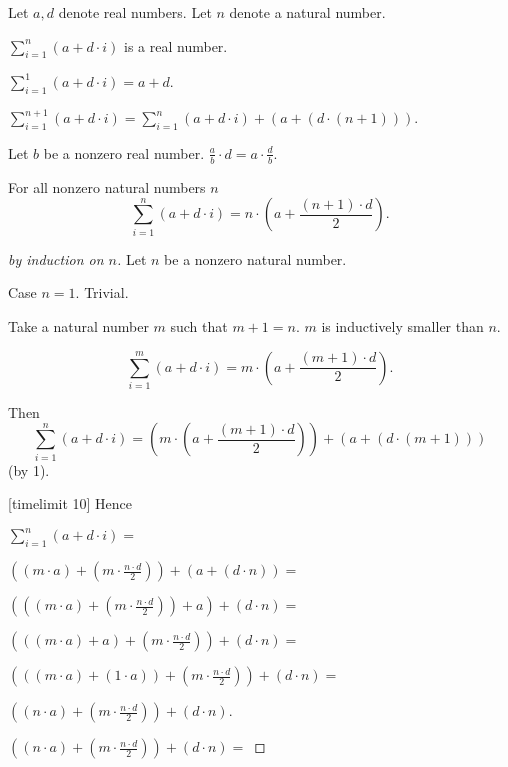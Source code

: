 \documentclass{article}
\begin{document}
\newcommand{\sumarith}[3]{\sum_{i = 1}^{#3}(#1 + #2 \cdot i)}

\begin{forthel}
Let $a,d$ denote real numbers.
Let $n$ denote a natural number.

\begin{signature}
$\sumarith{a}{d}{n}$ is a real number.
\end{signature}

\begin{axiom}
$\sumarith{a}{d}{1} = a + d$.
\end{axiom}

\begin{axiom}[1]
$\sumarith{a}{d}{n+1} = \sumarith{a}{d}{n} + (a + (d \cdot (n + 1)))$.
\end{axiom}

\begin{lemma}
Let $b$ be a nonzero real number.
$\frac{a}{b} \cdot d = a \cdot \frac{d}{b}$.
\end{lemma}

\begin{theorem} For all nonzero natural numbers $n$
$$\sumarith{a}{d}{n} = n \cdot ( a + \frac{(n + 1) \cdot d}{2}).$$
\end{theorem}
\begin{proof}[by induction on $n$]
Let $n$ be a nonzero natural number.

Case $n = 1$.
Trivial.

Take a natural number $m$ such that $m + 1 = n$. $m$ is inductively smaller than $n$.

$$\sumarith{a}{d}{m} = m \cdot ( a + \frac{(m + 1) \cdot d}{2}).$$

Then
$$\sumarith{a}{d}{n} = 
(m \cdot ( a + \frac{(m + 1) \cdot d}{2})) + (a + (d \cdot (m + 1)))$$
(by 1).


[timelimit 10]
Hence

$\sumarith{a}{d}{n} =$

$((m \cdot a) + (m \cdot \frac{n \cdot d}{2})) + (a + (d \cdot n)) =$

$(((m \cdot a) + (m \cdot \frac{n \cdot d}{2})) + a) + (d \cdot n) =$

$(((m \cdot a) + a) +  (m \cdot \frac{n \cdot d}{2})) + (d \cdot n) =$

$(((m \cdot a) + (1 \cdot a)) +  (m \cdot \frac{n \cdot d}{2})) + (d \cdot n) =$

$((n \cdot a) +  (m \cdot \frac{n \cdot d}{2})) + (d \cdot n)$.

$((n \cdot a) +  (m \cdot \frac{n \cdot d}{2})) + (d \cdot n) =$


\end{proof}
\end{forthel}
\end{document}
